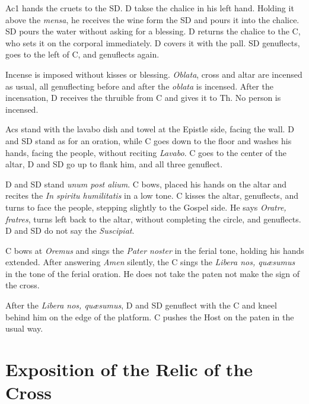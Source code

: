 {    \rubric Ac1 hands the cruets to the SD. D takse the chalice in his left
    hand. Holding it above the \textit{mensa}, he receives the wine form the SD
    and pours it into the chalice. SD pours the water without asking for a
    blessing. D returns the chalice to the C, who sets it on the corporal
    immediately. D covers it with the pall. SD genuflects, goes to the left of
    C, and genuflects again.

    \rubric Incense is imposed without kisses or blessing. \textit{Oblata},
    cross and altar are incensed as usual, all genuflecting before and after
    the \textit{oblata} is incensed. After the incensation, D receives the
    thruible from C and gives it to Th. No person is incensed.

    \rubric Acs stand with the lavabo dish and towel at the Epistle side,
    facing the wall. D and SD stand as for an oration, while C goes down to the
    floor and washes his hands, facing the people, without reciting
    \textit{Lavabo}. C goes to the center of the altar, D and SD go up to flank
    him, and all three genuflect.

    \rubric D and SD stand \textit{unum post alium}. C bows, placed his hands
    on the altar and recites the \textit{In spiritu humilitatis} in a low tone.
    C kisses the altar, genuflects, and turns to face the people, stepping
    slightly to the Gospel side. He says \textit{Oratre, fratres}, turns left
    back to the altar, without completing the circle, and genuflects. D and SD
    do not say the \textit{Suscipiat}.

    \rubric C bows at \textit{Oremus} and sings the \textit{Pater noster} in
    the ferial tone, holding his hands extended. After answering \textit{Amen}
    silently, the C sings the \textit{Libera nos, quæsumus} in the tone of the
    ferial oration. He does not take the paten not make the sign of the cross.

    \rubric After the \textit{Libera nos, quæsumus}, D and SD genuflect with
    the C and kneel behind him on the edge of the platform. C pushes the Host
    on the paten in the usual way.

    \section{Exposition of the Relic of the Cross}

    }


